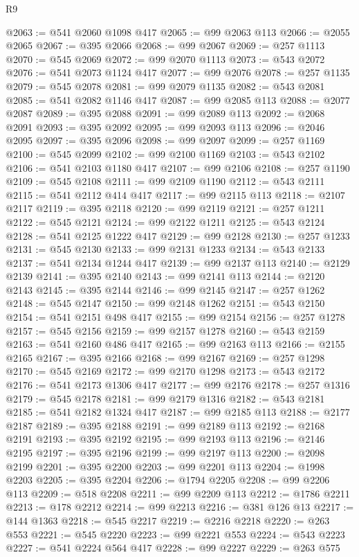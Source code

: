 \begin{lexlean}{R9}
\begin{coremodule}
@2063 := @541 @2060 @1098 @417
@2065 := @99 @2063 @113
@2066 := @2055 @2065
@2067 := @395 @2066
@2068 := @99 @2067
@2069 := @257 @1113
@2070 := @545 @2069
@2072 := @99 @2070 @1113
@2073 := @543 @2072
@2076 := @541 @2073 @1124 @417
@2077 := @99 @2076
@2078 := @257 @1135
@2079 := @545 @2078
@2081 := @99 @2079 @1135
@2082 := @543 @2081
@2085 := @541 @2082 @1146 @417
@2087 := @99 @2085 @113
@2088 := @2077 @2087
@2089 := @395 @2088
@2091 := @99 @2089 @113
@2092 := @2068 @2091
@2093 := @395 @2092
@2095 := @99 @2093 @113
@2096 := @2046 @2095
@2097 := @395 @2096
@2098 := @99 @2097
@2099 := @257 @1169
@2100 := @545 @2099
@2102 := @99 @2100 @1169
@2103 := @543 @2102
@2106 := @541 @2103 @1180 @417
@2107 := @99 @2106
@2108 := @257 @1190
@2109 := @545 @2108
@2111 := @99 @2109 @1190
@2112 := @543 @2111
@2115 := @541 @2112 @414 @417
@2117 := @99 @2115 @113
@2118 := @2107 @2117
@2119 := @395 @2118
@2120 := @99 @2119
@2121 := @257 @1211
@2122 := @545 @2121
@2124 := @99 @2122 @1211
@2125 := @543 @2124
@2128 := @541 @2125 @1222 @417
@2129 := @99 @2128
@2130 := @257 @1233
@2131 := @545 @2130
@2133 := @99 @2131 @1233
@2134 := @543 @2133
@2137 := @541 @2134 @1244 @417
@2139 := @99 @2137 @113
@2140 := @2129 @2139
@2141 := @395 @2140
@2143 := @99 @2141 @113
@2144 := @2120 @2143
@2145 := @395 @2144
@2146 := @99 @2145
@2147 := @257 @1262
@2148 := @545 @2147
@2150 := @99 @2148 @1262
@2151 := @543 @2150
@2154 := @541 @2151 @498 @417
@2155 := @99 @2154
@2156 := @257 @1278
@2157 := @545 @2156
@2159 := @99 @2157 @1278
@2160 := @543 @2159
@2163 := @541 @2160 @486 @417
@2165 := @99 @2163 @113
@2166 := @2155 @2165
@2167 := @395 @2166
@2168 := @99 @2167
@2169 := @257 @1298
@2170 := @545 @2169
@2172 := @99 @2170 @1298
@2173 := @543 @2172
@2176 := @541 @2173 @1306 @417
@2177 := @99 @2176
@2178 := @257 @1316
@2179 := @545 @2178
@2181 := @99 @2179 @1316
@2182 := @543 @2181
@2185 := @541 @2182 @1324 @417
@2187 := @99 @2185 @113
@2188 := @2177 @2187
@2189 := @395 @2188
@2191 := @99 @2189 @113
@2192 := @2168 @2191
@2193 := @395 @2192
@2195 := @99 @2193 @113
@2196 := @2146 @2195
@2197 := @395 @2196
@2199 := @99 @2197 @113
@2200 := @2098 @2199
@2201 := @395 @2200
@2203 := @99 @2201 @113
@2204 := @1998 @2203
@2205 := @395 @2204
@2206 := @1794 @2205
@2208 := @99 @2206 @113
@2209 := @518 @2208
@2211 := @99 @2209 @113
@2212 := @1786 @2211
@2213 := @178 @2212
@2214 := @99 @2213
@2216 := @381 @126 @13
@2217 := @144 @1363
@2218 := @545 @2217
@2219 := @2216 @2218
@2220 := @263 @553
@2221 := @545 @2220
@2223 := @99 @2221 @553
@2224 := @543 @2223
@2227 := @541 @2224 @564 @417
@2228 := @99 @2227
@2229 := @263 @575

\end{coremodule}
\end{lexlean}
